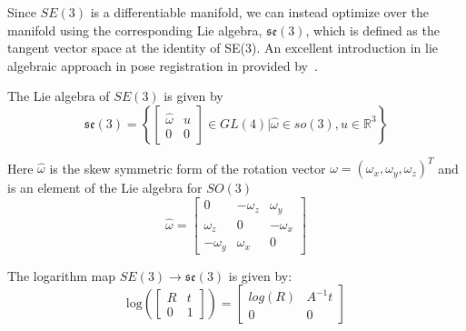 Since $SE(3)$ is a differentiable manifold, we can instead optimize over the manifold using the corresponding Lie algebra, $\mathfrak{se}(3)$, which is defined as the tangent vector space at the identity of SE(3). An excellent introduction in lie algebraic approach in pose registration in provided by~\citet{Agrawal2006Lie}. 

\noindent The Lie algebra of $SE(3)$ is given by
\begin{equation}
    \mathfrak{se}(3) = \left\{
    \begin{bmatrix}
        \hat{\omega} & u \\
        0 & 0
    \end{bmatrix}
    \in GL(4) \rvert \hat{\omega}\in so(3), u \in \mathbb{R}^3
    \right\}
\end{equation}

\noindent Here $\hat{\omega}$ is the skew symmetric form of the rotation vector
$\omega = (\omega_x, \omega_y, \omega_z)^T$ and is an element of the Lie algebra for $SO(3)$
\begin{equation}
    \hat{\omega} =
    \begin{bmatrix}
        0 & -\omega_z & \omega_y  \\
        \omega_z & 0 & -\omega_x \\
        -\omega_y & \omega_x & 0
    \end{bmatrix}
\end{equation}

\noindent The logarithm map $SE(3) \to \mathfrak{se}(3)$ is given by:
\begin{equation}
    \text{log}\left(
        \begin{bmatrix}
            R & t \\
            0 & 1
        \end{bmatrix}
    \right)  =
    \begin{bmatrix}
        log(R) & A^{-1}t \\
        0 & 0
    \end{bmatrix}
    \label{eq:logMap}
\end{equation}

